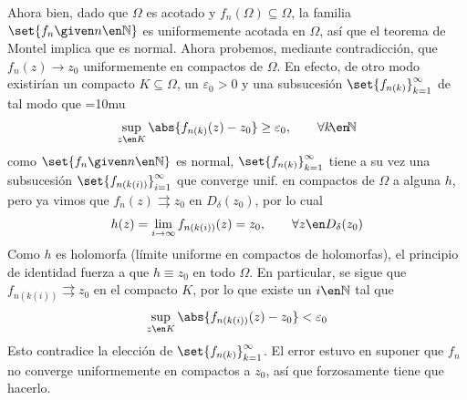 \begin{sol}
Ahora bien, dado que $\Omega$ es acotado y $f_n(\Omega) \subseteq \Omega$, la familia $\set{f_n\given n \en\mathbb{N}}$ es uniformemente acotada en $\Omega$, así que el teorema de Montel implica que es normal.
Ahora probemos, mediante contradicción, que $f_n(z) \to z_0$ uniformemente en compactos de $\Omega$. En efecto, de otro modo existirían un compacto $K\subseteq \Omega$, un $\varepsilon_0>0$ y una subsucesión $\set{f_{n(k)}}^\infty_{k=1}$ de tal modo que 
{\thickmuskip=10mu
\[
\sup_{z\en K} \abs{f_{n(k)}(z)-z_0} \ge \varepsilon_0, 
\qquad\forall k\!\en\!\mathbb{N}
\]}%
como $\set{f_n \given n\en\mathbb{N}}$ es normal, $\set{f_{n(k)}}^\infty_{k=1}$ tiene a su vez una subsucesión $\set{f_{n(k(i))}}^\infty_{i=1}$ que converge unif. en compactos de $\Omega$ a alguna $h$, pero ya vimos que $f_n(z) \rightrightarrows z_0$ en $D_{\delta}(z_0)$, por lo cual
\[
h(z) = \lim_{i\to\infty} f_{n(k(i))}(z) = z_0,
\qquad\forall z\en D_{\delta}(z_0)
\]
Como $h$ es holomorfa (límite uniforme en compactos de holomorfas), el principio de identidad fuerza a que $h \equiv z_0$ en todo $\Omega$. En particular, se sigue que $f_{n(k(i))} \rightrightarrows z_0$ en el compacto $K$, por lo que existe un $i\en\mathbb{N}$ tal que
\[
\sup_{z\en K} \abs{f_{n(k(i))}(z)-z_0} < \varepsilon_0
\]
Esto contradice la elección de $\set{f_{n(k)}}^\infty_{k=1}$. El error estuvo en suponer que $f_n$ no converge uniformemente en compactos a $z_0$, así que forzosamente tiene que hacerlo.
\end{sol}